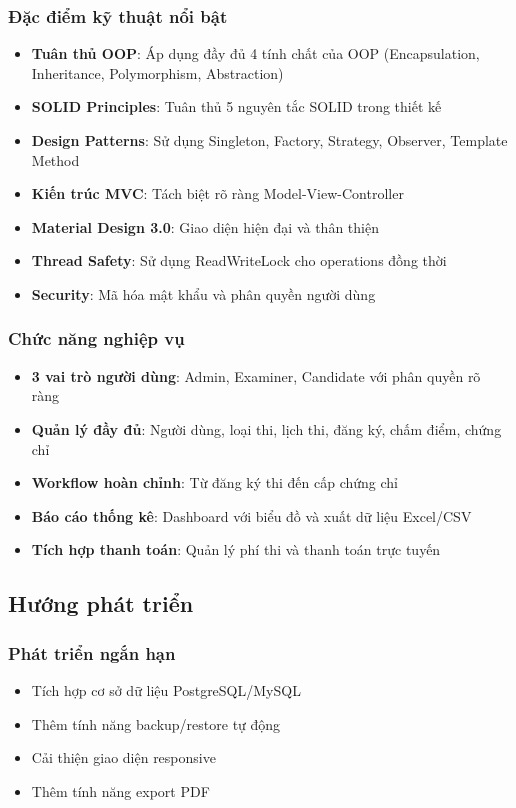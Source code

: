 \documentclass[12pt,a4paper]{article}
\begin{document}
\subsubsection{Đặc điểm kỹ thuật nổi bật}
\begin{itemize}
    \item \textbf{Tuân thủ OOP}: Áp dụng đầy đủ 4 tính chất của OOP (Encapsulation, Inheritance, Polymorphism, Abstraction)
    \item \textbf{SOLID Principles}: Tuân thủ 5 nguyên tắc SOLID trong thiết kế
    \item \textbf{Design Patterns}: Sử dụng Singleton, Factory, Strategy, Observer, Template Method
    \item \textbf{Kiến trúc MVC}: Tách biệt rõ ràng Model-View-Controller
    \item \textbf{Material Design 3.0}: Giao diện hiện đại và thân thiện
    \item \textbf{Thread Safety}: Sử dụng ReadWriteLock cho operations đồng thời
    \item \textbf{Security}: Mã hóa mật khẩu và phân quyền người dùng
\end{itemize}

\subsubsection{Chức năng nghiệp vụ}
\begin{itemize}
    \item \textbf{3 vai trò người dùng}: Admin, Examiner, Candidate với phân quyền rõ ràng
    \item \textbf{Quản lý đầy đủ}: Người dùng, loại thi, lịch thi, đăng ký, chấm điểm, chứng chỉ
    \item \textbf{Workflow hoàn chỉnh}: Từ đăng ký thi đến cấp chứng chỉ
    \item \textbf{Báo cáo thống kê}: Dashboard với biểu đồ và xuất dữ liệu Excel/CSV
    \item \textbf{Tích hợp thanh toán}: Quản lý phí thi và thanh toán trực tuyến
\end{itemize}

\subsection{Hướng phát triển}

\subsubsection{Phát triển ngắn hạn}
\begin{itemize}
    \item Tích hợp cơ sở dữ liệu PostgreSQL/MySQL
    \item Thêm tính năng backup/restore tự động
    \item Cải thiện giao diện responsive
    \item Thêm tính năng export PDF
\end{itemize}
\end{document}
